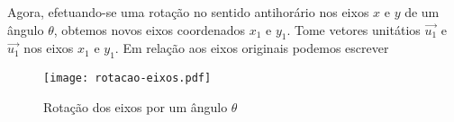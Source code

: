 Agora, efetuando-se uma rota\c{c}\~ao no sentido antihor\'ario nos eixos $x$ e $y$ de um \^angulo $\theta$, obtemos novos eixos coordenados $x_1$ e $y_1$. Tome vetores unit\'atios $\vec{u_1}$ e $\vec{u_1}$ nos eixos $x_1$ e $y_1$. Em rela\c{c}\~ao aos eixos originais podemos escrever
\begin{figure}[!h]
  \centering
  \caption{Rota\c{c}\~ao dos eixos por um \^angulo $\theta$}
  \texttt{[image: rotacao-eixos.pdf]}


\end{figure}
